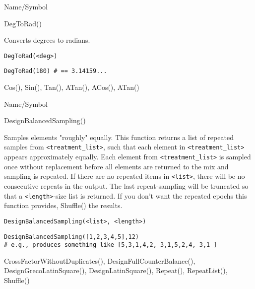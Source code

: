\begin{desc}{Name/Symbol}
\item[Name/Symbol]  	DegToRad()

\item[Description]  	Converts degrees to radians.

\item[Usage]
\begin{verbatim}
DegToRad(<deg>)
\end{verbatim}

\item[Example]     	
\begin{verbatim}
DegToRad(180) # == 3.14159...
\end{verbatim}

\item[See Also]    	Cos(), Sin(), Tan(), ATan(), ACos(), ATan() 
\end{desc}

\rl



\begin{desc}{Name/Symbol}
\item[Name/Symbol]  	DesignBalancedSampling()

\item[Description] 	Samples elements "roughly" equally.
  		This function returns a list of repeated samples from
 		\verb+<treatment_list>+, such that each element in \verb+<treatment_list>+ 
		appears approximately equally.  Each element from 
		\verb+<treatment_list>+ is sampled once without replacement before 
		all elements are returned to the mix and sampling is repeated.  
		If there are no repeated items in \verb+<list>+, there will be no
 		consecutive repeats in the output.  The last repeat-sampling 
		will be truncated so that a \verb+<length>+-size list is returned.  
		If you don't want the repeated epochs this function provides, 
		Shuffle() the results.

\item[Usage]
\begin{verbatim}
DesignBalancedSampling(<list>, <length>)
\end{verbatim}

\item[Example]
\begin{verbatim}
DesignBalancedSampling([1,2,3,4,5],12)
# e.g., produces something like [5,3,1,4,2, 3,1,5,2,4, 3,1 ]
\end{verbatim}

\item[See Also]	CrossFactorWithoutDuplicates(), DesignFullCounterBalance(),
  		DesignGrecoLatinSquare(), DesignLatinSquare(), Repeat(), 
		RepeatList(), Shuffle()

\end{desc}

